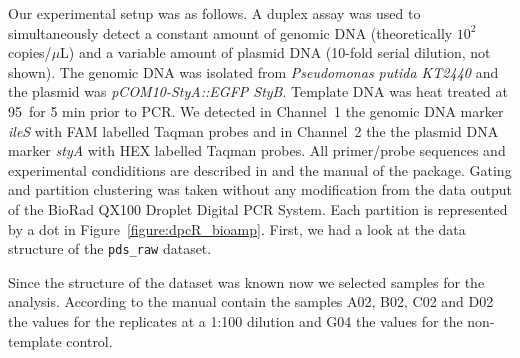Our experimental setup was as follows. A duplex assay was used to simultaneously 
detect a constant amount of genomic DNA (theoretically $10^{2}$ copies/$\mu$L) 
and a variable amount of plasmid DNA (10-fold serial dilution, not shown). The 
genomic DNA was isolated from \textit{Pseudomonas putida KT2440} and the plasmid 
was \textit{pCOM10-StyA::EGFP StyB}. Template DNA was heat treated at 
95\textcelsius~for 5 min prior to PCR. We detected in Channel~1 the genomic DNA 
marker \textit{ileS} with FAM labelled Taqman probes and in Channel~2 the the 
plasmid DNA marker \textit{styA} with HEX labelled Taqman probes. All 
primer/probe sequences and experimental condiditions are described in 
\citep{jahn_2013, jahn_2014} and the manual of the  package. 
Gating and partition clustering was taken without any modification from the data 
output of the BioRad QX100 Droplet  Digital PCR System. Each partition is 
represented by a dot in Figure~\ref{figure:dpcR_bioamp}. First, we had a look at 
the data structure of the \texttt{pds\_raw} dataset.


Since the structure of the dataset was known now we selected samples for the 
analysis. According to the  manual contain the samples A02, 
B02, C02 and D02 the values for the replicates at a 1:100 dilution 
and G04 the values for the non-template control.

